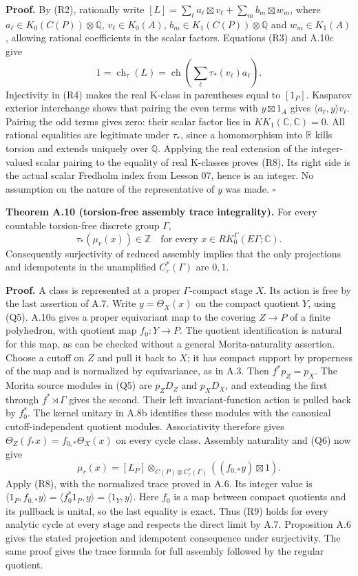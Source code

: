 \documentclass[
  11pt,
]{article}
\begin{document}
\textbf{Proof.} By (R2), rationally write
\([L]=\sum_\ell a_\ell\boxtimes v_\ell+
       \sum_m b_m\boxtimes w_m\), where
\(a_\ell\in K_0(C(P))\otimes\mathbb Q\), \(v_\ell\in K_0(A)\),
\(b_m\in K_1(C(P))\otimes\mathbb Q\) and \(w_m\in K_1(A)\), allowing
rational coefficients in the scalar factors. Equations (R3) and A.10c
give \[
 1=\operatorname{ch}_\tau(L)
       =\operatorname{ch}\!\left(
                     \sum_\ell\tau_*(v_\ell)a_\ell\right).
\] Injectivity in (R4) makes the real K-class in parentheses equal to
\([1_P]\). Kasparov exterior interchange shows that pairing the even
terms with \(y\boxtimes1_A\) gives \(\langle a_\ell,y\rangle v_\ell\).
Pairing the odd terms gives zero: their scalar factor lies in
\(KK_1(\mathbb C,\mathbb C)=0\). All rational equalities are legitimate
under \(\tau_*\), since a homomorphism into \(\mathbb R\) kills torsion
and extends uniquely over \(\mathbb Q\). Applying the real extension of
the integer-valued scalar pairing to the equality of real K-classes
proves (R8). Its right side is the actual scalar Fredholm index from
Lesson 07, hence is an integer. No assumption on the nature of the
representative of \(y\) was made. \(\square\)

\textbf{Theorem A.10 (torsion-free assembly trace integrality).} For
every countable torsion-free discrete group \(\Gamma\), \[
 \tau_*(\mu_r(x))\in\mathbb Z
       \quad\text{for every }x\in RK_0^\Gamma(E\Gamma;\mathbb C).
 \tag{R9}
\] Consequently surjectivity of reduced assembly implies that the only
projections and idempotents in the unamplified \(C_r^*(\Gamma)\) are
\(0,1\).

\textbf{Proof.} A class is represented at a proper \(\Gamma\)-compact
stage \(X\). Its action is free by the last assertion of A.7. Write
\(y=\Theta_X(x)\) on the compact quotient \(Y\), using (Q5). A.10a gives
a proper equivariant map to the covering \(Z\to P\) of a finite
polyhedron, with quotient map \(f_0:Y\to P\). The quotient
identification is natural for this map, as can be checked without a
general Morita-naturality assertion. Choose a cutoff on \(Z\) and pull
it back to \(X\); it has compact support by properness of the map and is
normalized by equivariance, as in A.3. Then \(f^*p_Z=p_X\). The Morita
source modules in (Q5) are \(p_ZD_Z\) and \(p_XD_X\), and extending the
first through \(f^*\rtimes\Gamma\) gives the second. Their left
invariant-function action is pulled back by \(f_0^*\). The kernel
unitary in A.8b identifies these modules with the canonical
cutoff-independent quotient modules. Associativity therefore gives
\(\Theta_Z(f_*x)=f_{0,*}\Theta_X(x)\) on every cycle class. Assembly
naturality and (Q6) now give \[
 \mu_r(x)=
 [L_P]\otimes_{C(P)\otimes C_r^*(\Gamma)}
                   ((f_{0,*}y)\boxtimes1).
 \tag{R10}
\] Apply (R8), with the normalized trace proved in A.6. Its integer
value is \(\langle1_P,f_{0,*}y\rangle=\langle f_0^*1_P,y\rangle
=\langle1_Y,y\rangle\). Here \(f_0\) is a map between compact quotients
and its pullback is unital, so the last equality is exact. Thus (R9)
holds for every analytic cycle at every stage and respects the direct
limit by A.7. Proposition A.6 gives the stated projection and idempotent
consequence under surjectivity. The same proof gives the trace formula
for full assembly followed by the regular quotient.
\end{document}
